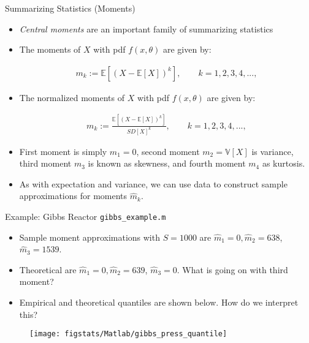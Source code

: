 \documentclass[9pt]{beamer}
\begin{document}
\begin{frame}{Summarizing Statistics (Moments)}

\begin{itemize}
 \setlength{\itemsep}{5pt}
\item {\em Central moments} are an important family of summarizing statistics

\item The moments of $X$ with pdf $f(x,\theta)$ are given by:
\begin{block}{}
\begin{align*}
m_k:=\mathbb{E}[(X-\mathbb{E}[X])^k], \qquad k=1,2,3,4,...,
\end{align*}
\end{block}
\item The normalized moments of $X$ with pdf $f(x,\theta)$ are given by:
\begin{block}{}
\begin{align*}
m_k:=\frac{\mathbb{E}[(X-\mathbb{E}[X])^k]}{SD[X]^k}, \qquad k=1,2,3,4,...,
\end{align*}
\end{block}

\item First moment is simply $m_1=0$, second moment $m_2=\mathbb{V}[X]$ is variance, third moment $m_3$ is known as skewness, and fourth moment  $m_4$ as kurtosis. 

\item As with expectation and variance, we can use data to construct sample approximations for moments $\hat{m}_k$. 

\end{itemize}

\end{frame}

\begin{frame}{Example: Gibbs Reactor \footnotesize{\texttt{gibbs\_example.m}}}
\begin{itemize}
\item Sample moment approximations with $S=1000$ are $\hat{m}_1=0,\hat{m}_2=638$, $\hat{m}_3=1539$.
\item Theoretical are $\hat{m}_1=0,\hat{m}_2=639$, $\hat{m}_3=0$. What is going on with third moment?
\item Empirical and theoretical quantiles are shown below. How do we interpret this? 
\end{itemize}
\begin{figure}[!htb]
    \centering
	\texttt{[image: figstats/Matlab/gibbs\_press\_quantile]}
\end{figure}
\end{frame}
\end{document}
